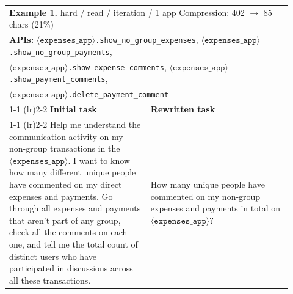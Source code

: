 \begin{table}[t]
\centering
\small
\renewcommand{\arraystretch}{1.25}
\begin{tabular}{p{0.46\linewidth} p{0.46\linewidth}}
\toprule
\multicolumn{2}{l}{\textbf{Example 1.} hard / read / iteration / 1 app \quad\quad Compression: 402 $\rightarrow$ 85 chars (21\%)} \\
\multicolumn{2}{p{0.94\linewidth}}{\textbf{APIs:} $\langle \texttt{expenses\_app} \rangle$\texttt{.show\_no\_group\_expenses}, $\langle \texttt{expenses\_app} \rangle$\texttt{.show\_no\_group\_payments},}\\
\multicolumn{2}{p{0.94\linewidth}}{$\langle \texttt{expenses\_app} \rangle$\texttt{.show\_expense\_comments}, $\langle \texttt{expenses\_app} \rangle$\texttt{.show\_payment\_comments},}\\
\multicolumn{2}{p{0.94\linewidth}}{$\langle \texttt{expenses\_app} \rangle$\texttt{.delete\_payment\_comment}} \\
\cmidrule(lr){1-1} \cmidrule(lr){2-2}
\textbf{Initial task} & \textbf{Rewritten task} \\
\cmidrule(lr){1-1} \cmidrule(lr){2-2}
Help me understand the communication activity on my non-group transactions in the $\langle \texttt{expenses\_app}\rangle$. I want to know how many different unique people have commented on my direct expenses and payments. Go through all expenses and payments that aren't part of any group, check all the comments on each one, and tell me the total count of distinct users who have participated in discussions across all these transactions.
&
How many unique people have commented on my non-group expenses and payments in total on $\langle \texttt{expenses\_app}\rangle?$ \\
\midrule


\end{tabular}
\end{table}
